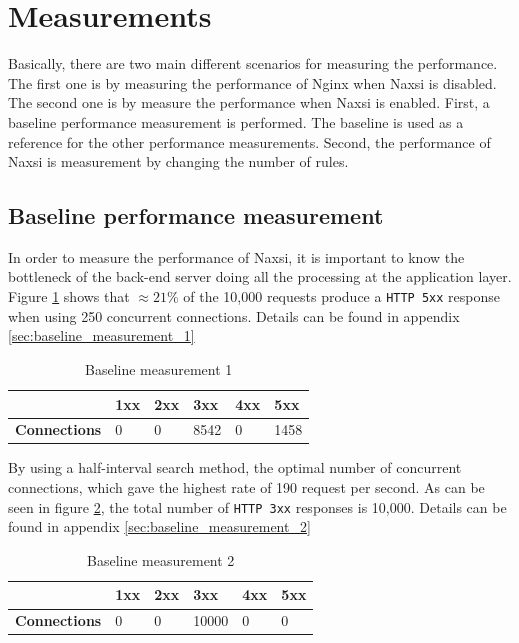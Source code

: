 \documentclass[Measurements]{subfiles}
\begin{document}
\section{Measurements}

\label{sec:Measurements}
Basically, there are two main different scenarios for measuring the performance. The first one is by measuring the performance of Nginx when Naxsi is disabled. The second one is by measure the performance when Naxsi is enabled. First, a baseline performance measurement is performed. The baseline is used as a reference for the other performance measurements. Second, the performance of Naxsi is measurement by changing the number of rules.

\subsection{Baseline performance measurement}
\label{sec:Baseline performance measurement}
In order to measure the performance of Naxsi, it is important to know the bottleneck of the back-end server doing all the processing at the application layer. Figure \ref{fig:Baseline measurement 1} shows that $\approx 21\%$ of the 10,000 requests produce a \verb+HTTP 5xx+ response when using 250 concurrent connections. Details can be found in appendix \ref{sec:baseline_measurement_1}

\begin{table}[!h]
\caption{Baseline measurement 1}
\begin{tabular}{|p{2cm}|p{}|p{}|p{}|p{}|p{}|}
\hline
 & \textbf{1xx} & \textbf{2xx} & \textbf{3xx} & \textbf{4xx} & \textbf{5xx} \\ \hline
\textbf{Connections} & 0 & 0 & 8542 & 0 & 1458 \\ \hline
\end{tabular}
\label{fig:Baseline measurement 1}
\end{table}

By using a half-interval search method, the optimal number of concurrent connections, which gave the highest rate of 190 request per second. As can be seen in figure \ref{fig:Baseline measurement 2}, the total number of \verb+HTTP 3xx+ responses is 10,000. Details can be found in appendix \ref{sec:baseline_measurement_2}

\begin{table}[h]
\caption{Baseline measurement 2}
\begin{tabular}{|p{2cm}|p{}|p{}|p{}|p{}|p{}|}
\hline
 & \textbf{1xx} & \textbf{2xx} & \textbf{3xx} & \textbf{4xx} & \textbf{5xx} \\ \hline
\textbf{Connections} & 0 & 0 & 10000 & 0 & 0 \\ \hline
\end{tabular}
\label{fig:Baseline measurement 2}
\end{table}
\end{document}
